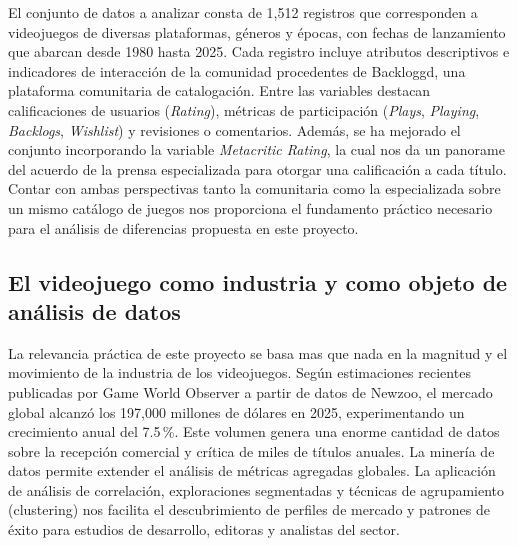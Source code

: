 \documentclass[letterpaper,11pt]{article}
\begin{document}
El conjunto de datos a analizar consta de 1,512 registros que corresponden a videojuegos de diversas plataformas, géneros y épocas, con fechas de lanzamiento que abarcan desde 1980 hasta 2025. Cada registro incluye atributos descriptivos e indicadores de interacción de la comunidad procedentes de Backloggd, una plataforma comunitaria de catalogación. Entre las variables destacan calificaciones de usuarios (\textit{Rating}), métricas de participación (\textit{Plays}, \textit{Playing}, \textit{Backlogs}, \textit{Wishlist}) y revisiones o comentarios. Además, se ha mejorado el conjunto incorporando la variable \textit{Metacritic Rating}, la cual nos da un panorame del acuerdo de la prensa especializada para otorgar una calificación a cada título. Contar con ambas perspectivas tanto la comunitaria como la especializada sobre un mismo catálogo de juegos nos proporciona el fundamento práctico necesario para el análisis de diferencias propuesta en este proyecto.

\subsection{El videojuego como industria y como objeto de análisis de datos}

La relevancia práctica de este proyecto se basa mas que nada en la magnitud y el movimiento de la industria de los videojuegos. Según estimaciones recientes publicadas por Game World Observer a partir de datos de Newzoo, el mercado global alcanzó los 197,000 millones de dólares en 2025, experimentando un crecimiento anual del 7.5\,\%. Este volumen genera una enorme cantidad de datos sobre la recepción comercial y crítica de miles de títulos anuales. La minería de datos permite extender el análisis de métricas agregadas globales. La aplicación de análisis de correlación, exploraciones segmentadas y técnicas de agrupamiento (clustering) nos facilita el descubrimiento de perfiles de mercado y patrones de éxito para estudios de desarrollo, editoras y analistas del sector.
\end{document}
